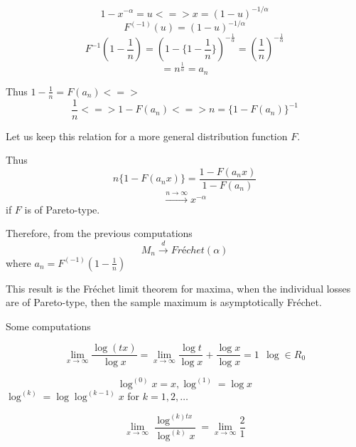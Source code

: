 \documentclass[11pt,a4paper,oneside]{article}\usepackage[]{graphicx}\usepackage[]{color}
\begin{document}
$$1-x^{-\alpha}=u<=>x=(1-u)^{-1/\alpha}$$
$$F^{(-1)}(u)=(1-u)^{-1/\alpha}$$
$$F^{-1}(1-\frac{1}{n})=(1-\{1-\frac{1}{n}\})^{-\frac{1}{\alpha}}=(\frac{1}{n})^{-\frac{1}{\alpha}}$$
$$=n^{\frac{1}{\alpha}}=a_n$$

Thus $1-\frac{1}{n}=F(a_n)<=>$ $$\frac{1}{n}<=>1-F(a_n)<=>n=\{1-F(a_n)\}^{-1}$$

Let us keep this relation  for a more general distribution function $F$.

Thus
$$n\{1-F(a_nx)\}=\frac{1-F(a_nx)}{1-F(a_n)}$$
$$\xrightarrow{n\rightarrow\infty}x^{-\alpha}$$
if $F$ is of Pareto-type.

Therefore, from the previous computations
$$M_n\xrightarrow{d} Fréchet (\alpha)$$
where $a_n=F^{(-1)}(1-\frac{1}{n})$


This result is the Fréchet limit theorem for maxima, when the individual losses are of Pareto-type, then the sample  maximum is asymptotically Fréchet.

Some computations

$$\lim_{x\rightarrow\infty}\frac{\log(tx)}{\log x}=\lim_{x\rightarrow\infty}\frac{\log t}{\log x}+\frac{\log x}{\log x}=1\ \ \log \in R_0$$


$$\log^{(0)}x=x, \log^{(1)}=\log x$$
$\log^{(k)}=\log \log^{(k-1)}x$ for $k=1,2,\ldots$

$$\lim_{x\rightarrow\infty}\frac{\log^{(k)tx}}{\log^{(k)}x}=\lim_{x\rightarrow\infty}\frac{2}{1}$$
\end{document}
